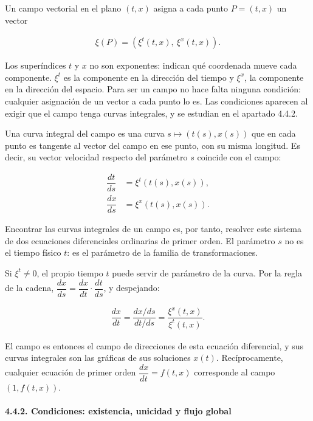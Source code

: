 \documentclass[
  spanish,
]{article}
\begin{document}
Un campo vectorial en el plano \((t, x)\) asigna a cada punto
\(P = (t, x)\) un vector

\[
\begin{aligned}
\xi(P) = \left(\xi^t(t, x),\ \xi^x(t, x)\right).
\end{aligned}
\]

Los superíndices \(t\) y \(x\) no son exponentes: indican qué coordenada
mueve cada componente. \(\xi^t\) es la componente en la dirección del
tiempo y \(\xi^x\), la componente en la dirección del espacio. Para ser
un campo no hace falta ninguna condición: cualquier asignación de un
vector a cada punto lo es. Las condiciones aparecen al exigir que el
campo tenga curvas integrales, y se estudian en el apartado 4.4.2.

Una curva integral del campo es una curva \(s \mapsto (t(s), x(s))\) que
en cada punto es tangente al vector del campo en ese punto, con su misma
longitud. Es decir, su vector velocidad respecto del parámetro \(s\)
coincide con el campo:

\[
\begin{aligned}
\dfrac{dt}{ds} &= \xi^t(t(s), x(s)), \\
\dfrac{dx}{ds} &= \xi^x(t(s), x(s)).
\end{aligned}
\]

Encontrar las curvas integrales de un campo es, por tanto, resolver este
sistema de dos ecuaciones diferenciales ordinarias de primer orden. El
parámetro \(s\) no es el tiempo físico \(t\): es el parámetro de la
familia de transformaciones.

Si \(\xi^t \neq 0\), el propio tiempo \(t\) puede servir de parámetro de
la curva. Por la regla de la cadena,
\(\dfrac{dx}{ds} = \dfrac{dx}{dt} \cdot \dfrac{dt}{ds}\), y despejando:

\[
\begin{aligned}
\dfrac{dx}{dt} = \dfrac{dx/ds}{dt/ds} = \dfrac{\xi^x(t, x)}{\xi^t(t, x)}.
\end{aligned}
\]

El campo es entonces el campo de direcciones de esta ecuación
diferencial, y sus curvas integrales son las gráficas de sus soluciones
\(x(t)\). Recíprocamente, cualquier ecuación de primer orden
\(\dfrac{dx}{dt} = f(t, x)\) corresponde al campo \((1, f(t, x))\).

\paragraph{4.4.2. Condiciones: existencia, unicidad y flujo
global}\label{condiciones-existencia-unicidad-y-flujo-global}
\end{document}
